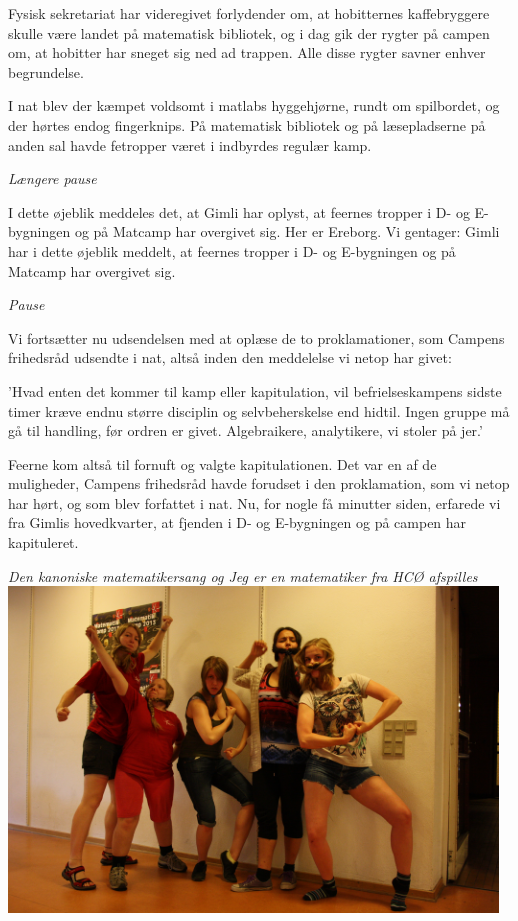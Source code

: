 \begin{minipage}[t]{170mm}
Fysisk sekretariat har videregivet forlydender om, at hobitternes kaffebryggere skulle være landet på matematisk bibliotek, og i dag gik der rygter på campen om, at hobitter har sneget sig ned ad trappen. Alle disse rygter savner enhver begrundelse.

I nat blev der kæmpet voldsomt i matlabs hyggehjørne, rundt om spilbordet, og der hørtes endog fingerknips. På matematisk bibliotek og på læsepladserne på anden sal havde fetropper været i indbyrdes regulær kamp.

\begin{center}
\emph{Længere pause}
\end{center}

I dette øjeblik meddeles det, at Gimli har oplyst, at feernes tropper i D- og E-bygningen og på Matcamp har overgivet sig. Her er Ereborg. Vi gentager: Gimli har i dette øjeblik meddelt, at feernes tropper i D- og E-bygningen og på Matcamp har overgivet sig.

\begin{center}
\emph{Pause}
\end{center}

Vi fortsætter nu udsendelsen med at oplæse de to proklamationer, som Campens frihedsråd udsendte i nat, altså inden den meddelelse vi netop har givet:

'Hvad enten det kommer til kamp eller kapitulation, vil befrielseskampens sidste timer kræve endnu større disciplin og selvbeherskelse end hidtil. Ingen gruppe må gå til handling, før ordren er givet. Algebraikere, analytikere, vi stoler på jer.'

Feerne kom altså til fornuft og valgte kapitulationen. Det var en af de muligheder, Campens frihedsråd havde forudset i den proklamation, som vi netop har hørt, og som blev forfattet i nat. Nu, for nogle få minutter siden, erfarede vi fra Gimlis hovedkvarter, at fjenden i D- og E-bygningen og på campen har kapituleret.

\begin{center}
\emph{Den kanoniske matematikersang og Jeg er en matematiker fra HCØ afspilles}
\vspace{3mm}
\includegraphics[width=130mm]{dvaergetropper.jpg}
\end{center}
\end{minipage}
